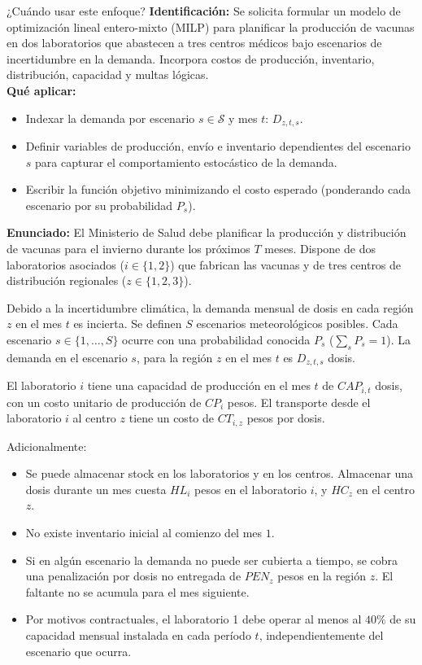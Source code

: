 \documentclass[11pt, a4paper]{article}
\begin{document}
  \begin{tipprueba}{¿Cuándo usar este enfoque?}
    \textbf{Identificación:} Se solicita formular un modelo de optimización lineal entero-mixto (MILP) para planificar la producción de vacunas en dos laboratorios que abastecen a tres centros médicos bajo escenarios de incertidumbre en la demanda. Incorpora costos de producción, inventario, distribución, capacidad y multas lógicas.\\
    \textbf{Qué aplicar:}
    \begin{itemize}
      \item Indexar la demanda por escenario $s \in \mathcal{S}$ y mes $t$: $D_{z,t,s}$.
      \item Definir variables de producción, envío e inventario dependientes del escenario $s$ para capturar el comportamiento estocástico de la demanda.
      \item Escribir la función objetivo minimizando el costo esperado (ponderando cada escenario por su probabilidad $P_s$).
    \end{itemize}
  \end{tipprueba}

  \textbf{Enunciado:}
  El Ministerio de Salud debe planificar la producción y distribución de vacunas para el invierno durante los próximos $T$ meses. Dispone de dos laboratorios asociados ($i \in \{1, 2\}$) que fabrican las vacunas y de tres centros de distribución regionales ($z \in \{1, 2, 3\}$). 

  Debido a la incertidumbre climática, la demanda mensual de dosis en cada región $z$ en el mes $t$ es incierta. Se definen $S$ escenarios meteorológicos posibles. Cada escenario $s \in \{1, \dots, S\}$ ocurre con una probabilidad conocida $P_s$ ($\sum_s P_s = 1$). La demanda en el escenario $s$, para la región $z$ en el mes $t$ es $D_{z,t,s}$ dosis.

  El laboratorio $i$ tiene una capacidad de producción en el mes $t$ de $CAP_{i,t}$ dosis, con un costo unitario de producción de $CP_i$ pesos. El transporte desde el laboratorio $i$ al centro $z$ tiene un costo de $CT_{i,z}$ pesos por dosis. 
  
  Adicionalmente:
  \begin{itemize}
    \item Se puede almacenar stock en los laboratorios y en los centros. Almacenar una dosis durante un mes cuesta $HL_i$ pesos en el laboratorio $i$, y $HC_z$ en el centro $z$.
    \item No existe inventario inicial al comienzo del mes $1$.
    \item Si en algún escenario la demanda no puede ser cubierta a tiempo, se cobra una penalización por dosis no entregada de $PEN_z$ pesos en la región $z$. El faltante no se acumula para el mes siguiente.
    \item Por motivos contractuales, el laboratorio 1 debe operar al menos al $40\%$ de su capacidad mensual instalada en cada período $t$, independientemente del escenario que ocurra.
  \end{itemize}
\end{document}
